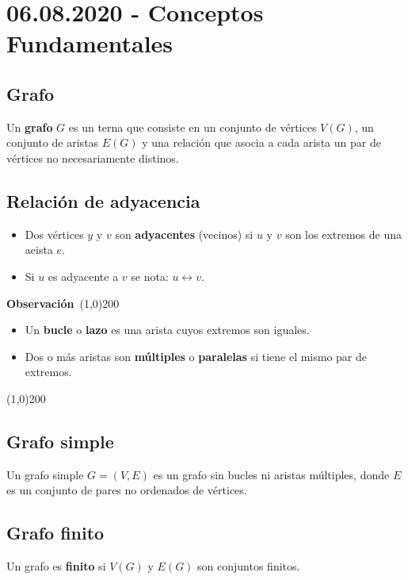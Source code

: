 \documentclass[a4paper]{book}
\newenvironment{obs}
    {
        \begin{flushleft}
       \textbf{Observación}\
        \line(1,0){200} \
        \end{flushleft}
    }
    {
        \begin{flushright}
        \line(1,0){200}
        \end{flushright}
    }
\begin{document}
\section{06.08.2020 - Conceptos Fundamentales}
\label{sec:conceptos_fundamentales}

\subsection{Grafo}
Un \textbf{grafo} \(G\) es un terna que consiste en un conjunto de vértices
\(V\left(G\right)\), un conjunto de aristas \(E\left(G\right)\) y una relación
que asocia a cada arista un par de vértices no necesariamente distinos.

\subsection{Relación de adyacencia}
\begin{itemize}
    \item Dos vértices \(y\text{ y }v\) son \textbf{adyacentes} (vecinos) si \(u\text{ y }v\) son los extremos de una aeista \(e\).
    \item  Si \(u\) es adyacente a \(v\) se nota: \(u\leftrightarrow v\).
\end{itemize}

\begin{obs}
    \begin{itemize}
        \item Un \textbf{bucle} o \textbf{lazo} es una arista cuyos extremos son iguales.
        \item Dos o más aristas son \textbf{múltiples} o \textbf{paralelas} si
            tiene el mismo par de extremos.
    \end{itemize}
\end{obs}

\subsection{Grafo simple}
Un grafo simple \(G=\left( V,E \right) \) es un grafo sin bucles ni aristas
múltiples, donde \(E\) es un conjunto de pares no ordenados de vértices.

\subsection{Grafo finito}
 Un grafo es  \textbf{finito} si \(V\left(G\right)\text{ y } E
 \left(G\right) \) son conjuntos finitos.
\end{document}
